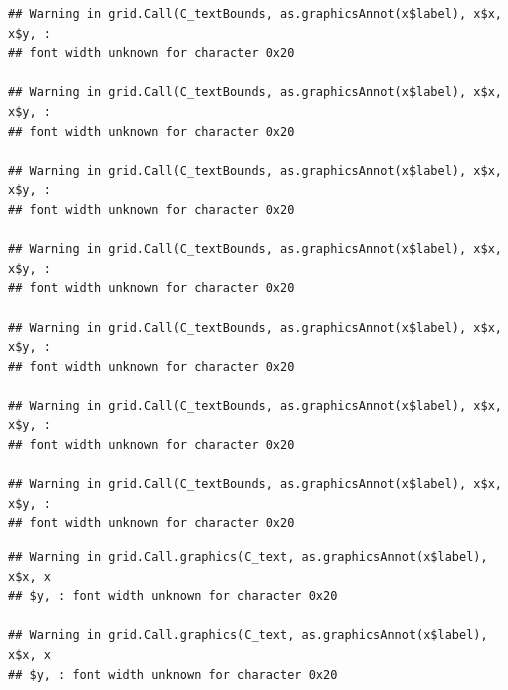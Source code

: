 \documentclass[]{article}
\theoremstyle{definition}
\theoremstyle{definition}
\theoremstyle{definition}
\theoremstyle{remark}
\begin{document}
\begin{verbatim}
## Warning in grid.Call(C_textBounds, as.graphicsAnnot(x$label), x$x, x$y, :
## font width unknown for character 0x20

## Warning in grid.Call(C_textBounds, as.graphicsAnnot(x$label), x$x, x$y, :
## font width unknown for character 0x20

## Warning in grid.Call(C_textBounds, as.graphicsAnnot(x$label), x$x, x$y, :
## font width unknown for character 0x20

## Warning in grid.Call(C_textBounds, as.graphicsAnnot(x$label), x$x, x$y, :
## font width unknown for character 0x20

## Warning in grid.Call(C_textBounds, as.graphicsAnnot(x$label), x$x, x$y, :
## font width unknown for character 0x20

## Warning in grid.Call(C_textBounds, as.graphicsAnnot(x$label), x$x, x$y, :
## font width unknown for character 0x20

## Warning in grid.Call(C_textBounds, as.graphicsAnnot(x$label), x$x, x$y, :
## font width unknown for character 0x20
\end{verbatim}

\begin{verbatim}
## Warning in grid.Call.graphics(C_text, as.graphicsAnnot(x$label), x$x, x
## $y, : font width unknown for character 0x20

## Warning in grid.Call.graphics(C_text, as.graphicsAnnot(x$label), x$x, x
## $y, : font width unknown for character 0x20
\end{verbatim}
\end{document}
